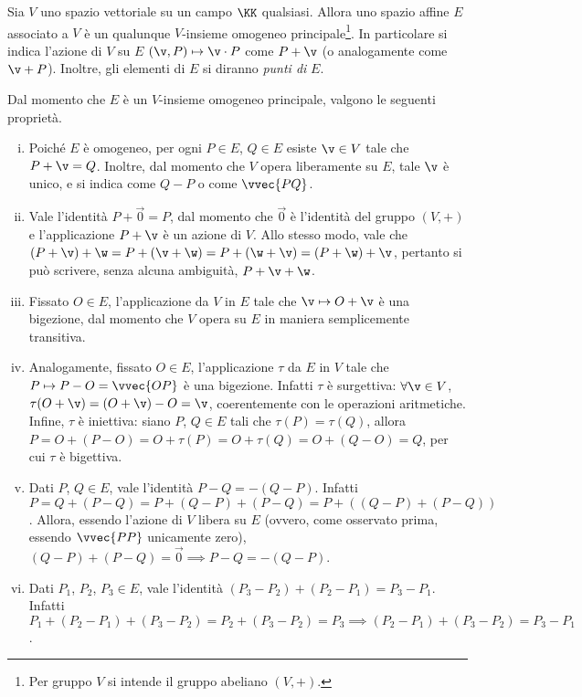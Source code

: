 \documentclass[11pt]{article}
\begin{document}
	\hr

	\begin{definition} 
		Sia $V$ uno spazio vettoriale su un campo $\KK$ qualsiasi.
		Allora uno spazio affine $E$ associato a $V$ è un qualunque
		$V$-insieme omogeneo principale\footnote{Per gruppo $V$ si intende il gruppo abeliano $(V, +)$.}.
		In particolare si indica l'azione di $V$ su $E$ $(\v, P) \mapsto \v \cdot P$ come $P + \v$ (o
		analogamente come $\v + P$). Inoltre, gli elementi di $E$ si
		diranno \textit{punti di} $E$.
	\end{definition}
	
	\begin{remark}
		Dal momento che $E$ è un $V$-insieme omogeneo principale, valgono le seguenti proprietà.
		
		\begin{enumerate}[(i)]
			\item Poiché $E$ è omogeneo, per ogni $P \in E$, $Q \in E$ esiste $\v \in V$ tale che $P + \v = Q$.
			Inoltre, dal momento che $V$ opera liberamente su $E$, tale $\v$ è unico, e si indica come
			$Q - P$ o come $\vvec{PQ}$.
			
			\item Vale l'identità $P + \vec 0 = P$, dal momento che $\vec 0$ è l'identità del gruppo $(V, +)$
			e l'applicazione $P + \v$ è un azione di $V$. Allo stesso modo, vale che $(P + \v) + \w = P + (\v + \w) =
			P + (\w + \v) = (P + \w) + \v$, pertanto si può scrivere, senza alcuna ambiguità, $P + \v + \w$.
			
			\item Fissato $O \in E$, l'applicazione da $V$ in $E$ tale che $\v \mapsto O + \v$ è una bigezione,
			dal momento che $V$ opera su $E$ in maniera semplicemente transitiva.
			
			\item Analogamente, fissato $O \in E$, l'applicazione $\tau$ da $E$ in $V$ tale che $P \mapsto P - O = \vvec{OP}$
			è una bigezione. Infatti $\tau$ è surgettiva: $\forall \v \in V$, $\tau(O + \v) = (O + \v) - O = \v$,
			coerentemente con le operazioni aritmetiche. Infine, $\tau$ è iniettiva: siano $P$, $Q \in E$ tali che
			$\tau(P) = \tau(Q)$, allora $P = O + (P - O) = O + \tau(P) = O + \tau(Q) = O + (Q - O) = Q$, per
			cui $\tau$ è bigettiva.
			
			\item Dati $P$, $Q \in E$, vale l'identità $P - Q = -(Q - P)$. Infatti $P = Q + (P-Q) = P + (Q-P) + (P-Q) =
			P + ((Q-P) + (P-Q))$. Allora, essendo l'azione di $V$ libera su $E$ (ovvero, come osservato prima,
			essendo $\vvec{PP}$ unicamente zero), $(Q-P) + (P-Q) = \vec 0 \implies P-Q = -(Q-P)$.
			
			\item Dati $P_1$, $P_2$, $P_3 \in E$, vale l'identità $(P_3 - P_2) + (P_2 - P_1) = P_3 - P_1$. Infatti
			$P_1 + (P_2 - P_1) + (P_3 - P_2) = P_2 + (P_3 - P_2) = P_3 \implies (P_2 - P_1) + (P_3 - P_2) = P_3 - P_1$.
		\end{enumerate}
	\end{remark}
\end{document}
